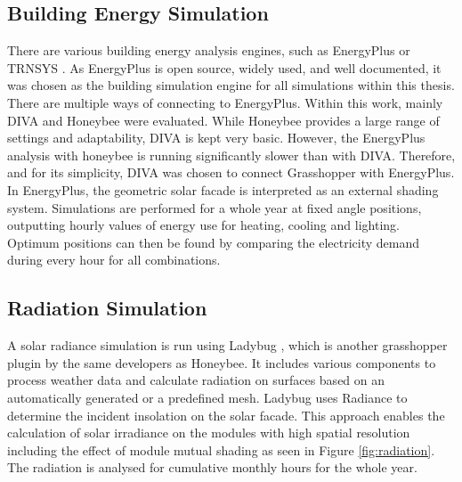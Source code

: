
		
		\subsection{Building Energy Simulation}

			There are various building energy analysis engines, such as EnergyPlus \cite{energyplus} or TRNSYS \cite{trnsys}. As EnergyPlus is open source, widely used, and well documented, it was chosen as the building simulation engine for all simulations within this thesis. There are multiple ways of connecting to EnergyPlus. Within this work, mainly DIVA \cite{DIVA} and Honeybee\cite{roudsari2014ladybug} were evaluated. While Honeybee provides a large range of settings and adaptability, DIVA is kept very basic. However, the EnergyPlus analysis with honeybee is running significantly slower than with DIVA. Therefore, and for its simplicity, DIVA was chosen to connect Grasshopper with EnergyPlus. In EnergyPlus, the geometric solar facade is interpreted as an external shading system. Simulations are performed for a whole year at fixed angle positions, outputting hourly values of energy use for heating, cooling and lighting. Optimum positions can then be found by comparing the electricity demand during every hour for all combinations. 

		\subsection{Radiation Simulation} 

			A solar radiance simulation is run using Ladybug \cite{roudsari2014ladybug}, which is another grasshopper plugin by the same developers as Honeybee. It includes various components to process weather data and calculate radiation on surfaces based on an automatically generated or a predefined mesh. Ladybug uses Radiance \cite{ward1994radiance} to determine the incident insolation on the solar facade. This approach enables the calculation of solar irradiance on the modules with high spatial resolution including the effect of module mutual shading as seen in Figure \ref{fig:radiation}. The radiation is analysed for cumulative monthly hours for the whole year. 

